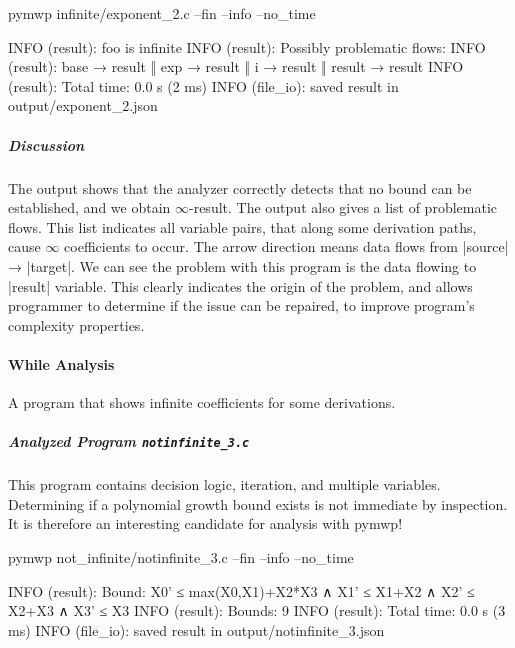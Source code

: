 \begin{cmdlisting}[label={lst:ex2-run-cmd}]
pymwp infinite/exponent_2.c --fin --info --no_time
\end{cmdlisting}

\begin{outlisting}[label={lst:ex2-output}]
INFO (result): foo is infinite
INFO (result): Possibly problematic flows:
INFO (result): base → result ‖ exp → result ‖ i → result ‖ result → result
INFO (result): Total time: 0.0 s (2 ms)
INFO (file_io): saved result in output/exponent_2.json
\end{outlisting}

\subparagraph*{Discussion}
The output shows that the analyzer correctly detects that no bound can
be established, and we obtain \(\infty\)-result.
The output also gives a list of problematic flows.
This list indicates all variable pairs, that along some derivation paths, cause \(\infty\) coefficients to occur.
The arrow direction means data flows from \pr|source| → \pr|target|.
We can see the problem with this program is the data flowing to \pr|result| variable.
This clearly indicates the origin of the problem, and allows programmer to determine if the issue can be
repaired, to improve program's complexity properties.

\paragraph{While Analysis}\label{while-analysis}
A program that shows infinite coefficients for some derivations.

\subparagraph*{Analyzed Program \texttt{notinfinite\_3.c}}\mbox{}

\begin{minipage}{\textwidth}

\end{minipage}
This program contains decision logic, iteration, and multiple variables.
Determining if a polynomial growth bound exists is not immediate by inspection.
It is therefore an interesting candidate for analysis with pymwp!

\begin{cmdlisting}[label={lst:ex3-run-cmd}]
pymwp not_infinite/notinfinite_3.c --fin --info --no_time
\end{cmdlisting}

\begin{outlisting}[label={lst:ex3-output}]
INFO (result): Bound: X0' ≤ max(X0,X1)+X2*X3 ∧ X1' ≤ X1+X2 ∧ X2' ≤ X2+X3 ∧ X3' ≤ X3
INFO (result): Bounds: 9
INFO (result): Total time: 0.0 s (3 ms)
INFO (file_io): saved result in output/notinfinite_3.json
\end{outlisting}

